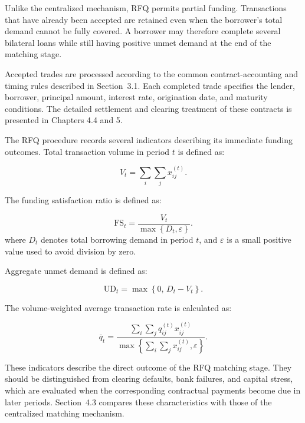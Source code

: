 Unlike the centralized mechanism, RFQ permits partial funding.
Transactions that have already been accepted are retained even when the
borrower's total demand cannot be fully covered. A borrower may
therefore complete several bilateral loans while still having positive
unmet demand at the end of the matching stage.

Accepted trades are processed according to the common
contract-accounting and timing rules described in Section~3.1. Each
completed trade specifies the lender, borrower, principal amount,
interest rate, origination date, and maturity conditions. The detailed
settlement and clearing treatment of these contracts is presented in
Chapters 4.4 and 5.

The RFQ procedure records several indicators describing its immediate
funding outcomes. Total transaction volume in period \(t\) is defined as:


\begin{equation}
V_t=\sum_i\sum_j x_{ij}^{(t)}\label{eq:trading-volume}.
\end{equation}


The funding satisfaction ratio is defined as:


\begin{equation}
\mathrm{FS}_t=\frac{V_t}{\max\left\{D_t,\varepsilon\right\}}\label{eq:funding-satisfaction}.
\end{equation}
\vspace{-0.4\baselineskip}
\noindent where \(D_{t}\) denotes total borrowing demand in period \(t\), and
\(\varepsilon\) is a small positive value used to avoid division by zero.

Aggregate unmet demand is defined as:


\begin{equation}
\mathrm{UD}_t=\max\left\{0,\,D_t-V_t\right\}\label{eq:unmet-demand}.
\end{equation}


The volume-weighted average transaction rate is calculated as:


\begin{equation}
\bar q_t=\frac{\displaystyle\sum_i\sum_j q_{ij}^{(t)}x_{ij}^{(t)}}{\max\left\{\displaystyle\sum_i\sum_j x_{ij}^{(t)},\varepsilon\right\}}\label{eq:average-quote}.
\end{equation}


These indicators describe the direct outcome of the RFQ matching stage.
They should be distinguished from clearing defaults, bank failures, and
capital stress, which are evaluated when the corresponding contractual
payments become due in later periods. Section~4.3 compares these
characteristics with those of the centralized matching mechanism.

